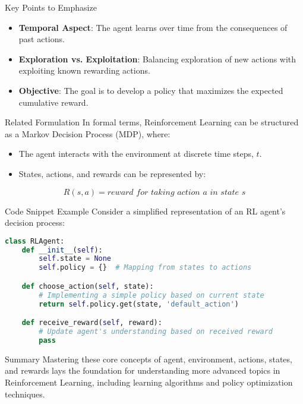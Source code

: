 \documentclass[aspectratio=169]{beamer}
\begin{document}
\begin{frame}{Key Points to Emphasize}
    \begin{itemize}
        \item \textbf{Temporal Aspect}: The agent learns over time from the consequences of past actions.
        \item \textbf{Exploration vs. Exploitation}: Balancing exploration of new actions with exploiting known rewarding actions.
        \item \textbf{Objective}: The goal is to develop a policy that maximizes the expected cumulative reward.
    \end{itemize}
\end{frame}

\begin{frame}{Related Formulation}
    In formal terms, Reinforcement Learning can be structured as a Markov Decision Process (MDP), where:
    
    \begin{itemize}
        \item The agent interacts with the environment at discrete time steps, \( t \).
        \item States, actions, and rewards can be represented by:
    \end{itemize}
    
    \begin{equation}
      R(s, a) = \textit{reward for taking action } a \textit{ in state } s
    \end{equation}
\end{frame}

\begin{frame}[fragile]{Code Snippet Example}
    Consider a simplified representation of an RL agent's decision process:
    
    \begin{lstlisting}[language=Python]
class RLAgent:
    def __init__(self):
        self.state = None
        self.policy = {}  # Mapping from states to actions

    def choose_action(self, state):
        # Implementing a simple policy based on current state
        return self.policy.get(state, 'default_action')

    def receive_reward(self, reward):
        # Update agent's understanding based on received reward
        pass
    \end{lstlisting}
\end{frame}

\begin{frame}{Summary}
    Mastering these core concepts of agent, environment, actions, states, and rewards lays the foundation for understanding more advanced topics in Reinforcement Learning, including learning algorithms and policy optimization techniques.
\end{frame}
\end{document}

